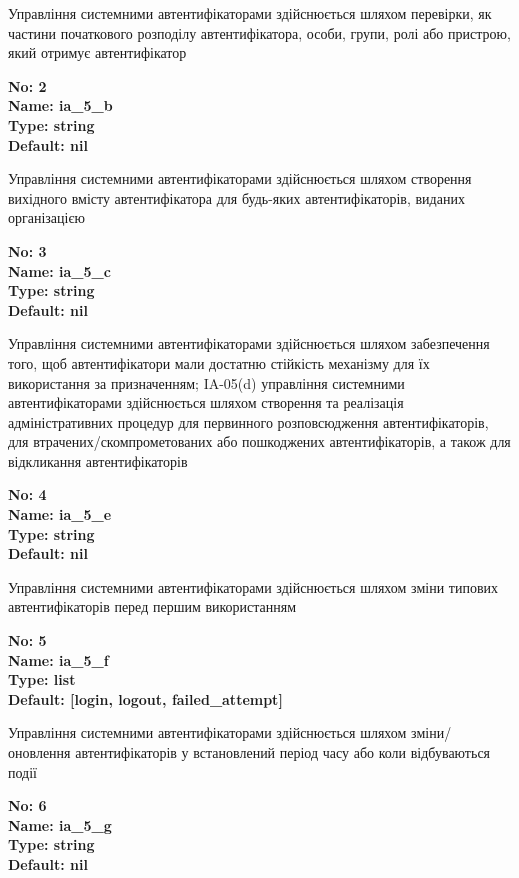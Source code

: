\documentclass{article}
\begin{document}
{\footnotesize Управління системними автентифікаторами здійснюється шляхом перевірки, як частини початкового розподілу автентифікатора, особи, групи, ролі або пристрою, який отримує автентифікатор}


{\footnotesize\bfseries
No: 2\\
Name: ia\_\allowbreak{}5\_\allowbreak{}b\\
Type: string\\
Default: nil
}

{\footnotesize Управління системними автентифікаторами здійснюється шляхом створення вихідного вмісту автентифікатора для будь-яких автентифікаторів, виданих організацією}


{\footnotesize\bfseries
No: 3\\
Name: ia\_\allowbreak{}5\_\allowbreak{}c\\
Type: string\\
Default: nil
}

{\footnotesize Управління системними автентифікаторами здійснюється шляхом забезпечення того, щоб автентифікатори мали достатню стійкість механізму для їх використання за призначенням; IA-05(d) управління системними автентифікаторами здійснюється шляхом створення та реалізація адміністративних процедур для первинного розповсюдження автентифікаторів, для втрачених/скомпрометованих або пошкоджених автентифікаторів, а також для відкликання автентифікаторів}


{\footnotesize\bfseries
No: 4\\
Name: ia\_\allowbreak{}5\_\allowbreak{}e\\
Type: string\\
Default: nil
}

{\footnotesize Управління системними автентифікаторами здійснюється шляхом зміни типових автентифікаторів перед першим використанням}


{\footnotesize\bfseries
No: 5\\
Name: ia\_\allowbreak{}5\_\allowbreak{}f\\
Type: list\\
Default: [\textquotedbl{}login\textquotedbl{}, \textquotedbl{}logout\textquotedbl{}, \textquotedbl{}failed\_\allowbreak{}attempt\textquotedbl{}]
}

{\footnotesize Управління системними автентифікаторами здійснюється шляхом зміни/оновлення автентифікаторів у встановлений період часу або коли відбуваються події}


{\footnotesize\bfseries
No: 6\\
Name: ia\_\allowbreak{}5\_\allowbreak{}g\\
Type: string\\
Default: nil
}
\end{document}
